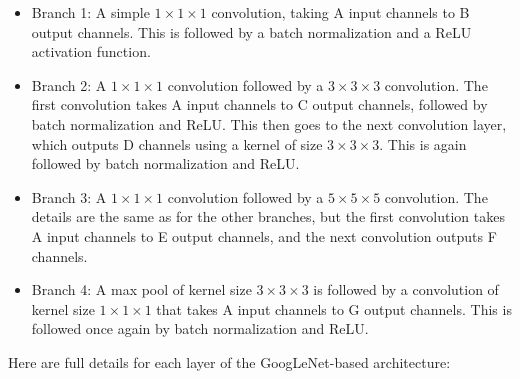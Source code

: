\begin{itemize}
    \item Branch 1: A simple $1 \times 1 \times 1$ convolution, taking A input channels to B output channels. This is followed by a batch normalization and a ReLU activation function.
    \item Branch 2: A $1 \times 1 \times 1$ convolution followed by a $3 \times 3 \times 3$ convolution. The first convolution takes A input channels to C output channels, followed by batch normalization and ReLU. This then goes to the next convolution layer, which outputs D channels using a kernel of size $3 \times 3 \times 3$. This is again followed by batch normalization and ReLU.
    \item Branch 3: A $1 \times 1 \times 1$ convolution followed by a $5 \times 5 \times 5$ convolution. The details are the same as for the other branches, but the first convolution takes A input channels to E output channels, and the next convolution outputs F channels.
    \item Branch 4: A max pool of kernel size $3 \times 3 \times 3$ is followed by a convolution of kernel size $1 \times 1 \times 1$ that takes A input channels to G output channels. This is followed once again by batch normalization and ReLU.
\end{itemize}

Here are full details for each layer of the GoogLeNet-based architecture:

